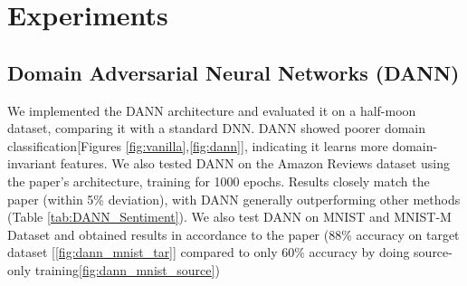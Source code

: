\documentclass{article}
\begin{document}
\section{Experiments}


\subsection{Domain Adversarial Neural Networks (DANN)}
We implemented the DANN\cite{ganin2016domainadversarialtrainingneuralnetworks} architecture and evaluated it on a half-moon dataset, comparing it with a standard DNN. DANN showed poorer domain classification[Figures \ref{fig:vanilla},\ref{fig:dann}], indicating it learns more domain-invariant features.
We also tested DANN on the Amazon Reviews dataset using the paper’s architecture, training for 1000 epochs. Results closely match the paper (within 5\% deviation), with DANN generally outperforming other methods (Table \ref{tab:DANN_Sentiment}). We also test DANN on MNIST and MNIST-M Dataset and obtained results in accordance to the paper (88\% accuracy on target dataset [\ref{fig:dann_mnist_tar}] compared to only 60\% accuracy by doing source-only training\ref{fig:dann_mnist_source})
\end{document}
